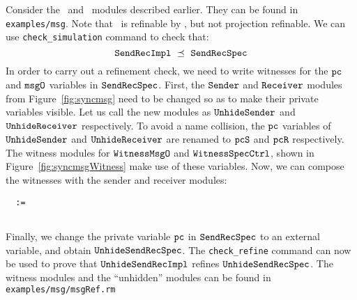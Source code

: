 \mypar
Consider the \SRImpl\ and \SRSpec\ modules described earlier. They can be 
found in {\tt examples/msg}. Note that \SRSpec\ is refinable by
\SRImpl, but not projection refinable. We can use {\tt check\_simulation}
command to check that:
  \[\mbox{\tt SendRecImpl}\ \preceq\ \mbox{\tt SendRecSpec}\]
In order to carry out a refinement check, we need to write witnesses for
the $\mbox{\tt pc}$ and $\mbox{\tt msgO}$ variables in $\mbox{\tt SendRecSpec}$.  
First, the $\mbox{\tt Sender}$ and $\mbox{\tt Receiver}$
modules from Figure~\ref{fig:syncmsg} need to be changed so as to
make their private variables visible. Let us call the new modules
as  $\mbox{\tt UnhideSender}$ and $\mbox{\tt UnhideReceiver}$ respectively. 
To avoid a name collision, the $\mbox{\tt pc}$ variables of 
$\mbox{\tt UnhideSender}$ and $\mbox{\tt UnhideReceiver}$ are renamed
to $\mbox{\tt pcS}$ and $\mbox{\tt pcR}$ respectively. The witness modules for 
$\mbox{\tt WitnessMsgO}$ and $\mbox{\tt WitnessSpecCtrl}$, shown in Figure~\ref{fig:syncmsgWitness}
make use of these variables.
Now, we can compose the witnesses with the sender and receiver modules:

\mypar
{\tt
\USRImpl\ := \\
\qu \USSender\ \pppar\ \USReceiver\ \pppar\ \WitnessMsgO\ \pppar\ \WitnessSpecCtrl
}

\mypar
Finally, we change the private variable $\mbox{\tt pc}$ in $\mbox{\tt SendRecSpec}$ to an external
variable, and obtain $\mbox{\tt UnhideSendRecSpec}$. The {\tt check\_refine} command
can now be used to prove that $\mbox{\tt UnhideSendRecImpl}$ refines $\mbox{\tt UnhideSendRecSpec}$.
The witness modules and the ``unhidden'' modules can be found in 
{\tt examples/msg/msgRef.rm}

